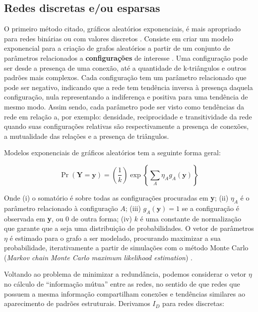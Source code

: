 \subsection{Redes discretas e/ou esparsas}

O primeiro método citado, gráficos aleatórios exponenciais, é mais apropriado
para redes binárias ou com valores discretos \citep{Dekker2007}. Consiste em
criar um modelo exponencial para a criação de grafos aleatórios a partir de um
conjunto de parâmetros relacionados a \textbf{configurações} de interesse
\citep{ROBINS2007a}. Uma configuração pode ser desde a presença de uma conexão,
até a quantidade de k-triângulos e outros padrões mais complexos. Cada
configuração tem um parâmetro relacionado que pode ser negativo, indicando que a
rede tem tendência inversa à presença daquela configuração, nula representando a
indiferença e positiva para uma tendência de mesmo modo. Assim sendo, cada
parâmetro pode ser visto como tendências da rede em relação a, por exemplo:
densidade, reciprocidade e transitividade da rede quando suas configurações
relativas são respectivamente a presença de conexões, a mutualidade das relações
e a presença de triângulos.

Modelos exponenciais de gráficos aleatórios tem a seguinte forma geral:

\begin{equation}
\label{def:p_star_geral}
\Pr(\textbf{Y} = \textbf{y})
=\left(\frac{1}{k}\right)\exp\left\{\sum_A\eta_Ag_A(\textbf{y})\right\}
\end{equation}

Onde (i) o somatório é sobre todas as configurações procuradas em \textbf{y};
(ii) $\eta_A$ é o parâmetro relacionado à configuração $A$; (iii)
$g_A(\textbf{y})=1$ se a configuração é observada em \textbf{y}, ou 0 de outra
forma; (iv) $k$ é uma constante de normalização que garante que
a  seja uma distribuição de probabilidades. O vetor de
parâmetros $\eta$ é estimado para o grafo a ser modelado, procurando maximizar
a sua probabilidade, iterativamente a partir de simulações com o método Monte
Carlo (\emph{Markov chain Monte Carlo maximum likelihood estimation})
\citep{ROBINS2007b, Snijders2006}.

Voltando ao problema de minimizar a redundância, podemos considerar o vetor
$\eta$ no cálculo de ``informação mútua'' entre as redes, no sentido de que redes
que possuem a mesma informação compartilham conexões e tendências similares ao
aparecimento de padrões estruturais. Derivamos $I_D$ para redes discretas:


